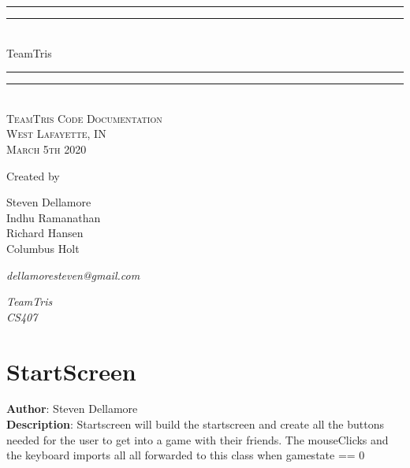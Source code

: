 \documentclass[12pt]{article}
\newlength{\drop}
\begin{document}
  \begin{titlepage}
    \centering
    \textheight
    \vspace*{7\baselineskip}
    \rule{\textwidth}{1.6pt}\vspace*{-\baselineskip}\vspace*{2pt}
    \rule{\textwidth}{0.4pt}\\[\baselineskip]
    {\LARGE TeamTris}\\[0.2\baselineskip]
    \rule{\textwidth}{0.4pt}\vspace*{-\baselineskip}\vspace{3.2pt}
    \rule{\textwidth}{1.6pt}\\[\baselineskip]
    \scshape
    TeamTris Code Documentation \\
    West Lafayette, IN \\
    March 5th 2020\par
    \vspace*{2\baselineskip}
    Created by \\[\baselineskip]
    {\Large Steven Dellamore \\ Indhu Ramanathan \\ Richard Hansen \\ Columbus Holt\par}
    {\itshape dellamoresteven@gmail.com\par}
    {\itshape TeamTris \\ CS407\par}
  \end{titlepage}
  
\tableofcontents
\newpage


\section{StartScreen}
\textbf{Author}: Steven Dellamore \\
\textbf{Description}: Startscreen will build the startscreen and create all the buttons needed for the user to get into a game with their friends. The mouseClicks and the keyboard imports all all forwarded to this class when gamestate == 0 \\
\end{document}
